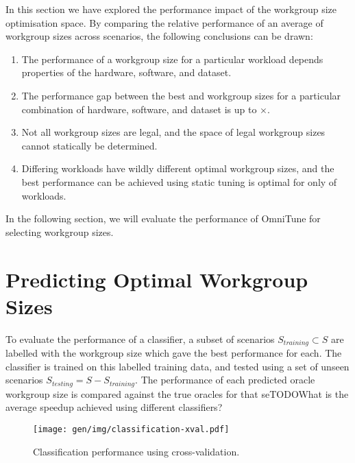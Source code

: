 In this section we have explored the performance impact of the
workgroup size optimisation space. By comparing the relative
performance of an average of  workgroup
sizes across  scenarios, the following
conclusions can be drawn:

\begin{enumerate}
\item The performance of a workgroup size for a particular workload
  depends properties of the hardware, software, and dataset.
\item The performance gap between the best and workgroup sizes for a
  particular combination of hardware, software, and dataset is up to
  $\times$.
\item Not all workgroup sizes are legal, and the space of legal
  workgroup sizes cannot statically be determined.
\item Differing workloads have wildly different optimal workgroup
  sizes, and the best performance can be achieved using static tuning
  is optimal for only  of
  workloads.
\end{enumerate}


In the following section, we will evaluate the performance of OmniTune
for selecting workgroup sizes.


\section{Predicting Optimal Workgroup Sizes}


To evaluate the performance of a classifier, a subset of scenarios
$S_{training} \subset S$ are labelled with the workgroup size which
gave the best performance for each. The classifier is trained on this
labelled training data, and tested using a set of unseen scenarios
$S_{testing} = S - S_{training}$. The performance of each predicted
oracle workgroup size is compared against the true oracles for that
seTODO{What is the average speedup achieved using different
  classifiers?}


\begin{figure}
\centering
\texttt{[image: gen/img/classification-xval.pdf]}
\caption{%
  Classification performance using cross-validation.%
}
\end{figure}

